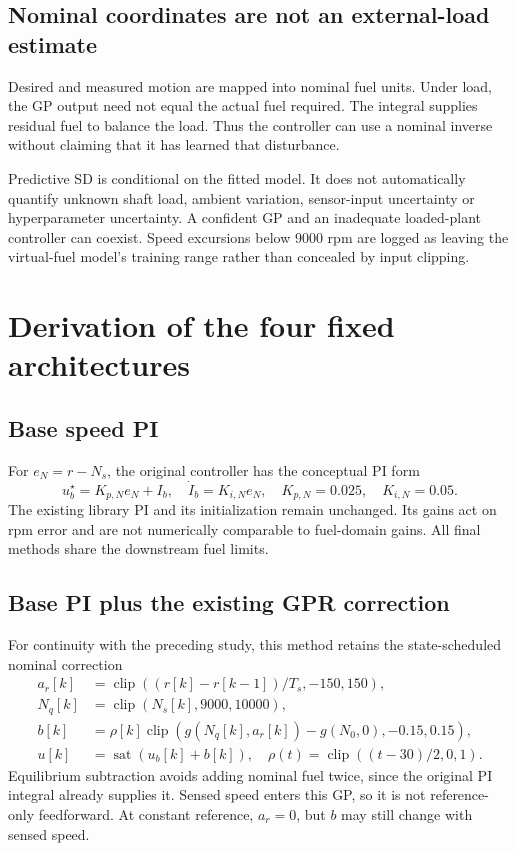 \documentclass[11pt,a4paper]{article}
\begin{document}
\subsection{Nominal coordinates are not an external-load estimate}
Desired and measured motion are mapped into nominal fuel units. Under load, the GP output need not equal the actual fuel required. The integral supplies residual fuel to balance the load. Thus the controller can use a nominal inverse without claiming that it has learned that disturbance.

Predictive SD is conditional on the fitted model. It does not automatically quantify unknown shaft load, ambient variation, sensor-input uncertainty or hyperparameter uncertainty. A confident GP and an inadequate loaded-plant controller can coexist. Speed excursions below 9000 rpm are logged as leaving the virtual-fuel model's training range rather than concealed by input clipping.

\section{Derivation of the four fixed architectures}
\subsection{Base speed PI}
For $e_N=r-N_s$, the original controller has the conceptual PI form
\begin{equation}
u_b^\star=K_{p,N}e_N+I_b,\quad \dot I_b=K_{i,N}e_N,\quad K_{p,N}=0.025,\quad K_{i,N}=0.05.
\end{equation}
The existing library PI and its initialization remain unchanged. Its gains act on rpm error and are not numerically comparable to fuel-domain gains. All final methods share the downstream fuel limits.

\subsection{Base PI plus the existing GPR correction}
For continuity with the preceding study, this method retains the state-scheduled nominal correction
\begin{align}
a_r[k]&=\operatorname{clip}((r[k]-r[k-1])/T_s,-150,150),\\
N_q[k]&=\operatorname{clip}(N_s[k],9000,10000),\\
b[k]&=\rho[k]\operatorname{clip}(g(N_q[k],a_r[k])-g(N_0,0),-0.15,0.15),\\
u[k]&=\operatorname{sat}(u_b[k]+b[k]),\quad \rho(t)=\operatorname{clip}((t-30)/2,0,1).
\label{eq:baseff}
\end{align}
Equilibrium subtraction avoids adding nominal fuel twice, since the original PI integral already supplies it. Sensed speed enters this GP, so it is not reference-only feedforward. At constant reference, $a_r=0$, but $b$ may still change with sensed speed.
\end{document}
